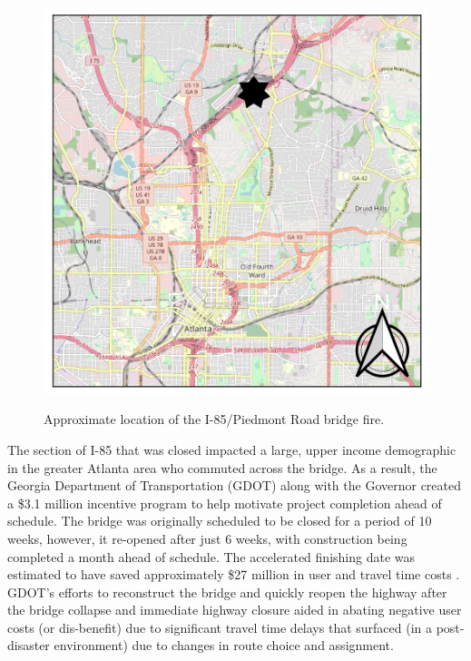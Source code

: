 \begin{figure}
\begin{center}

{\centering \includegraphics[width=0.65\linewidth]{figures/chapter2/I-85.png}}

\caption{Approximate location of the I-85/Piedmont Road bridge fire.}\label{fig:i85}

\end{center}
\end{figure}

The section of I-85 that was closed impacted a large, upper income
demographic in the greater
Atlanta area who commuted across the bridge.
As a result, the Georgia Department of Transportation (GDOT) along with
the Governor created a
\$3.1 million incentive program to help motivate project completion ahead
of schedule. The bridge
was originally scheduled to be closed for a period of 10 weeks, however, it re-opened after just 6
weeks, with construction being completed a month ahead of schedule. The
accelerated finishing
date was estimated to have saved approximately \$27 million in user and
travel time costs
\citep{GDOT2017}. GDOT’s efforts to reconstruct the bridge and quickly reopen the highway after the
bridge collapse and immediate highway closure aided in abating negative user costs (or dis-benefit) due to significant travel
time delays that surfaced (in a post-disaster environment)
due to changes in route choice and assignment.

